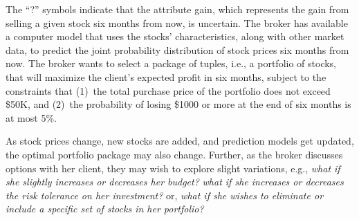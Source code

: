 \documentclass[11pt]{article}
\newcommand{\attr}[1]{{\sf #1}}
\newcommand{\ssf}[1]{{${\sf #1}$}}
\begin{document}
\noindent
The ``?'' symbols indicate that the attribute \attr{gain}, which represents the gain from selling a given stock six months from now, is uncertain. The broker has available a computer model that uses the stocks' characteristics, along with other market data, to predict the joint probability distribution of stock prices six months from now. The broker wants to select a package of tuples, i.e., a portfolio of stocks, that will maximize the client's expected profit in six months, subject to the constraints that (1)~the total purchase price of the portfolio does not exceed \$50K, and (2)~the probability of losing \$1000 or more at the end of six months is at most 5\%. 

As stock prices change, new stocks are added, and prediction models get updated, the optimal portfolio package may also change.  Further, as the broker discusses options with her client, they may wish to explore slight variations, e.g., \textit{what if she slightly increases or decreases her budget?} \textit{what if she increases or decreases the risk tolerance on her investment?} or, \textit{what if she wishes to eliminate or include a specific set of stocks in her portfolio?}
\end{document}
